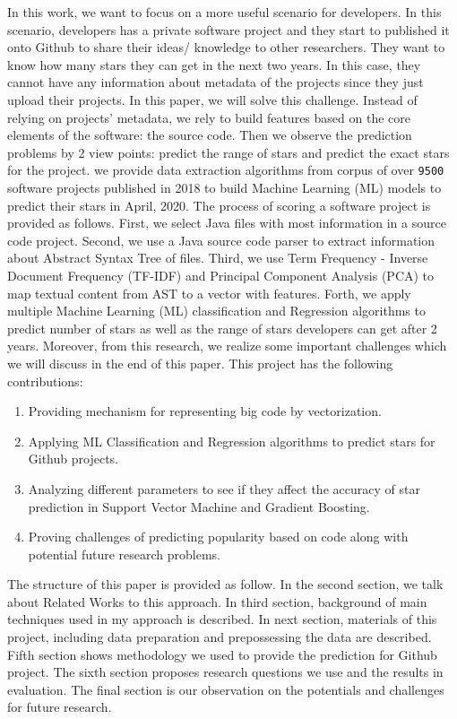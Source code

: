 In this work, we want to focus on a more useful scenario for developers. In this scenario, developers has a private software project and they start to published it onto Github to share their ideas/ knowledge to other researchers. They want to know how many stars they can get in the next two years. In this case, they cannot have any information about metadata of the projects since they just upload their projects. In this paper, we will solve this challenge. Instead of relying on projects' metadata, we rely to build features based on the core elements of the software: the source code. Then we observe the prediction problems by 2 view points: predict the range of stars and predict the exact stars for the project. we provide data extraction algorithms from corpus of over \texttt{9500} software projects published in 2018 to build Machine Learning (ML) models to predict their stars in April, 2020. 
The process of scoring a software project is provided as follows. First, we select Java files with most information in a source code project. Second, we use a Java source code parser to extract information about Abstract Syntax Tree of files. Third, we use Term Frequency - Inverse Document Frequency (TF-IDF) and Principal Component Analysis (PCA) to map textual content from AST to a vector with features. Forth, we apply multiple Machine Learning (ML) classification and Regression algorithms to predict number of stars as well as the range of stars developers can get after 2 years. Moreover, from this research, we realize some important challenges which we will discuss in the end of this paper. This project has the following contributions:
\begin{enumerate}
    \item Providing mechanism for representing big code by vectorization.
    \item Applying ML Classification and Regression algorithms to predict stars for Github projects.
    \item Analyzing different parameters to see if they affect the accuracy of star prediction in Support Vector Machine and Gradient Boosting.
    \item Proving challenges of predicting popularity based on code along with potential future research problems. 
\end{enumerate}

The structure of this paper is provided as follow. In the second section, we talk about Related Works to this approach. In third section, background of main techniques used in my approach is described. In next section, materials of this project, including data preparation and prepossessing the data are described. Fifth section shows methodology we used to provide the prediction for Github project. The sixth section proposes research questions we use and the results in evaluation. The final section is our observation on the potentials and challenges for future research. 

